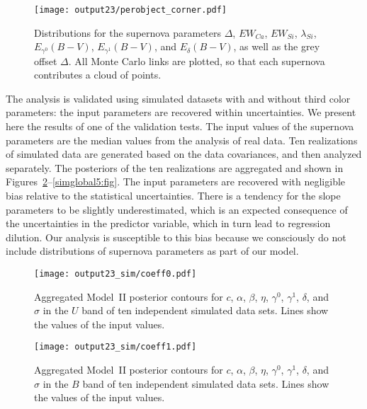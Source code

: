 \documentclass{aastex61}   	%
\begin{document}
\begin{figure}[htbp] %
   \centering
   \texttt{[image: output23/perobject\_corner.pdf]} 
   \caption{
   Distributions for the supernova parameters $\Delta$, $EW_{Ca}$, $EW_{Si}$, $\lambda_{Si}$, $E_{\gamma^0}(B-V)$,  $E_{\gamma^1}(B-V)$,  and $E_{\delta}(B-V)$, as well as the grey offset
$\Delta$.  All Monte Carlo links are plotted, so that each supernova contributes a cloud of points.
   \label{perobject2:fig}}
\end{figure}

\color{black}
The analysis is validated using simulated datasets with and without third color parameters: the input parameters are recovered within  uncertainties.
We present here the results of one of the validation tests.  The input values of the supernova parameters are the median values from the analysis of real data.
Ten realizations of simulated data are generated based on the data covariances, and then analyzed separately.   The posteriors of the ten realizations
are aggregated and shown in Figures~\ref{simglobal1:fig}--\ref{simglobal5:fig}.  The input parameters are recovered with negligible bias
relative to the statistical uncertainties.  There is a tendency for the slope parameters to be slightly underestimated, which is an expected consequence of 
the uncertainties in the predictor variable, which in turn lead to 
regression dilution.  Our analysis is susceptible to this bias because we consciously do not include distributions
of supernova parameters as part of our model.

\begin{figure}[htbp] %
   \centering
   \texttt{[image: output23\_sim/coeff0.pdf]} 
            \caption{Aggregated Model~II posterior contours for $c$, $\alpha$, $\beta$, $\eta$, $\gamma^0$, $\gamma^1$,  $\delta$, and $\sigma$ in the $U$ band of ten independent simulated data sets.  Lines show the values of the input values.
            \label{simglobal1:fig}}
\end{figure}

\begin{figure}[htbp] %
   \centering
   \texttt{[image: output23\_sim/coeff1.pdf]} 
            \caption{Aggregated Model~II posterior contours for $c$, $\alpha$, $\beta$, $\eta$, $\gamma^0$, $\gamma^1$,  $\delta$, and $\sigma$ in the $B$ band of ten independent simulated data sets.   Lines show the values of the input values.
 \label{simglobal2:fig}}
\end{figure}
\end{document}
